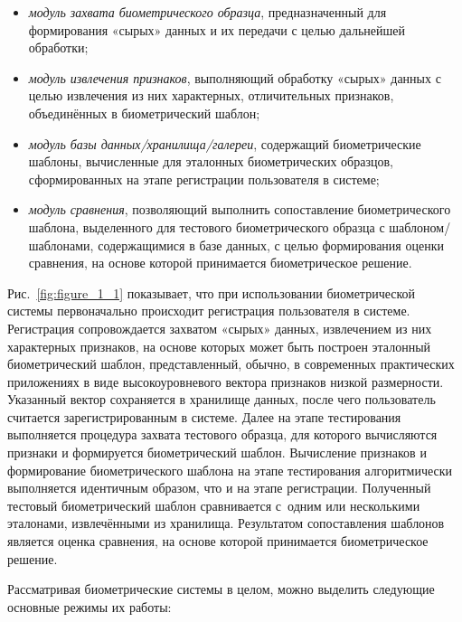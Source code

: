 \documentclass[12pt]{book}
\begin{document}
{\begin{itemize}[topsep=1pt] \itemsep0.1em
\item \textit{модуль захвата биометрического образца}, предназначенный для формирования «сырых» данных и их передачи с целью дальнейшей обработки;
\item \textit{модуль извлечения признаков}, выполняющий обработку «сырых» данных с целью извлечения из них характерных, отличительных признаков, объединённых в биометрический шаблон;
\item \textit{модуль базы данных/хранилища/галереи}, содержащий биометрические шаблоны, вычисленные для эталонных биометрических образцов, сформированных на этапе регистрации пользователя в системе;
\item \textit{модуль сравнения}, позволяющий выполнить сопоставление биометрического шаблона, выделенного для тестового биометрического образца с шаблоном/шаблонами, содержащимися в базе данных, с целью формирования оценки сравнения, на основе которой принимается биометрическое решение.
\end{itemize}

Рис.~\ref{fig:figure_1_1} показывает, что при использовании биометрической системы первоначально происходит регистрация пользователя в системе. Регистрация сопровождается захватом «сырых» данных, извлечением из них характерных признаков, на основе которых может быть построен эталонный биометрический шаблон, представленный, обычно, в современных практических приложениях в виде высокоуровневого вектора признаков низкой размерности. Указанный вектор сохраняется в хранилище данных, после чего пользователь считается зарегистрированным в системе. Далее на этапе тестирования выполняется процедура захвата тестового образца, для которого вычисляются признаки и формируется биометрический шаблон. Вычисление признаков и формирование биометрического шаблона на этапе тестирования алгоритмически выполняется идентичным образом, что и на этапе регистрации. Полученный тестовый биометрический шаблон сравнивается с~одним или несколькими эталонами, извлечёнными из хранилища. Результатом сопоставления шаблонов является оценка сравнения, на основе которой принимается биометрическое решение.

Рассматривая биометрические системы в целом, можно выделить следующие основные режимы их работы:

}
\end{document}
